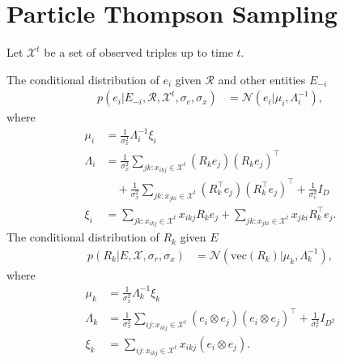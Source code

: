 \documentclass{article}
\begin{document}



\section{Particle Thompson Sampling}
Let $\mathcal{X}^{t}$ be a set of observed triples up to time $t$.

The conditional distribution of $e_i$ given $\mathcal{R}$ and other entities $E_{-i}$
\begin{align} \label{eqn:sample_e}
p(e_i |E_{-i}, \mathcal{R}, \mathcal{X}^{t}, \sigma_e, \sigma_x) &= \mathcal{N}(e_i | \mu_i, \Lambda_i^{-1}),
\end{align}
where
\begin{align*}
\mu_i &= \frac{1}{\sigma_x^2}\Lambda_i^{-1}\xi_i \\
\Lambda_i &= \frac{1}{\sigma_x^2} \sum_{jk : x_{ikj} \in \mathcal{X}^{t}} (R_k e_j)(R_k e_j)^\top \\
&\quad+ \frac{1}{\sigma_x^2} \sum_{jk : x_{jki} \in \mathcal{X}^{t}} (R_k^\top e_j)(R_k^\top e_j)^\top+ \frac{1}{\sigma_e^2} {I}_D \\
\xi_i &= \sum_{jk : x_{ikj} \in \mathcal{X}^{t}}  x_{ikj} R_{k} e_{j} + \sum_{jk : x_{jki} \in \mathcal{X}^{t}} x_{jki} R_{k}^\top e_{j}.
\end{align*}
The conditional distribution of $R_k$ given $E$
\begin{align}
\label{eqn:sample_r}
p(R_k|E, \mathcal{X}, \sigma_r, \sigma_x)  &= \mathcal{N}(\text{vec}(R_k) | \mu_k, \Lambda_k^{-1}),
\end{align}
where
\begin{align*}
\mu_k &= \frac{1}{\sigma_x^2}\Lambda_k^{-1}\xi_k \\
\Lambda_k &= \frac{1}{\sigma_x^2} \sum_{ij:x_{ikj} \in \mathcal{X}^{t}} (e_i \otimes e_j)(e_i \otimes e_j)^\top + \frac{1}{\sigma_r^2} {I}_{D^2} \\
\xi_k &= \sum_{ij:x_{ikj} \in \mathcal{X}^{t}} x_{ikj} (e_{i} \otimes e_{j}).
\end{align*}
\end{document}
